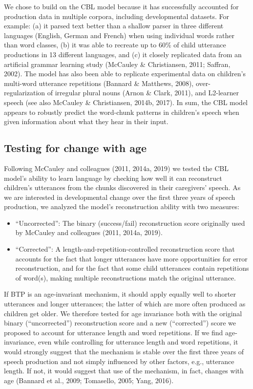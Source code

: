 \documentclass[man,mask,floatsintext]{apa6}
\providecommand{\tightlist}{%
  \setlength{\itemsep}{0pt}\setlength{\parskip}{0pt}}
\theoremstyle{definition}
\theoremstyle{definition}
\theoremstyle{definition}
\theoremstyle{remark}
\begin{document}
We chose to build on the CBL model because it has successfully accounted
for production data in multiple corpora, including developmental
datasets. For example: (a) it parsed text better than a shallow parser
in three different languages (English, German and French) when using
individual words rather than word classes, (b) it was able to recreate
up to 60\% of child utterance productions in 13 different languages, and
(c) it closely replicated data from an artificial grammar learning study
(McCauley \& Christiansen, 2011; Saffran, 2002). The model has also been
able to replicate experimental data on children's multi-word utterance
repetitions (Bannard \& Matthews, 2008), over-regularization of
irregular plural nouns (Arnon \& Clark, 2011), and L2-learner speech
(see also McCauley \& Christiansen, 2014b, 2017). In sum, the CBL model
appears to robustly predict the word-chunk patterns in children's speech
when given information about what they hear in their input.

\subsection{Testing for change with
age}\label{testing-for-change-with-age}

Following McCauley and colleagues (2011, 2014a, 2019) we tested the CBL
model's ability to learn language by checking how well it can
reconstruct children's utterances from the chunks discovered in their
caregivers' speech. As we are interested in developmental change over
the first three years of speech production, we analyzed the model's
reconstruction ability with two measures:

\begin{itemize}
\tightlist
\item
  \enquote{Uncorrected}: The binary (success/fail) reconstruction score
  originally used by McCauley and colleagues (2011, 2014a, 2019).
\item
  \enquote{Corrected}: A length-and-repetition-controlled reconstruction
  score that accounts for the fact that longer utterances have more
  opportunities for error reconstruction, and for the fact that some
  child utterances contain repetitions of word(s), making multiple
  reconstructions match the original utterance.
\end{itemize}

If BTP is an age-invariant mechanism, it should apply equally well to
shorter utterances and longer utterances; the latter of which are more
often produced as children get older. We therefore tested for age
invariance both with the original binary (\enquote{uncorrected})
reconstruction score and a new (\enquote{corrected}) score we proposed
to account for utterance length and word repetitions. If we find
age-invariance, even while controlling for utterance length and word
repetitions, it would strongly suggest that the mechanism is stable over
the first three years of speech production and not simply influenced by
other factors, e.g., utterance length. If not, it would suggest that use
of the mechanism, in fact, changes with age (Bannard et al., 2009;
Tomasello, 2005; Yang, 2016).
\end{document}
